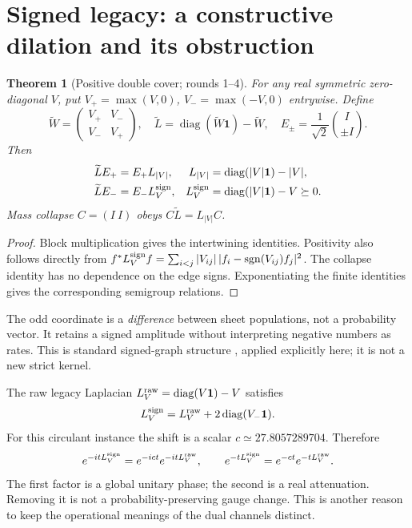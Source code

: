 \documentclass[11pt,a4paper]{article}
\newtheorem{theorem}{Theorem}
\newcommand{\one}{\mathbf 1}
\newcommand{\diag}{\operatorname{diag}}
\begin{document}
\section{Signed legacy: a constructive dilation and its obstruction}
\label{sec:signed}

\begin{theorem}[Positive double cover; rounds 1--4]
For any real symmetric zero-diagonal $V$, put
$V_+=\max(V,0)$, $V_-=\max(-V,0)$ entrywise. Define
\[
 \widetilde W=\begin{pmatrix}V_+&V_-\\V_-&V_+\end{pmatrix},\quad
 \widetilde L=\diag(\widetilde W\one)-\widetilde W,
 \quad E_\pm=\frac1{\sqrt2}\binom{I}{\pm I}.
\]
Then
\begin{align}
 \widetilde L E_+&=E_+L_{|V|},&
 L_{|V|}&=\diag(|V|\one)-|V|,\\
 \widetilde L E_-&=E_-L_V^{\rm sign},&
 L_V^{\rm sign}&=\diag(|V|\one)-V\succeq0.
\end{align}
Mass collapse $C=(I\ I)$ obeys $C\widetilde L=L_{|V|}C$.
\end{theorem}
\begin{proof}
Block multiplication gives the intertwining identities. Positivity also
follows directly from
$f^*L_V^{\rm sign}f=\sum_{i<j}|V_{ij}|\,
|f_i-\operatorname{sgn}(V_{ij})f_j|^2$.
The collapse identity has no dependence on the edge signs. Exponentiating
the finite identities gives the corresponding semigroup relations.
\end{proof}

The odd coordinate is a \emph{difference} between sheet populations, not a
probability vector. It retains a signed amplitude without interpreting
negative numbers as rates. This is standard signed-graph structure
\cite{zaslavsky}, applied explicitly here; it is not a new strict kernel.

The raw legacy Laplacian $L_V^{\rm raw}=\diag(V\one)-V$ satisfies
\[
 L_V^{\rm sign}=L_V^{\rm raw}+2\diag(V_-\one).
\]
For this circulant instance the shift is a scalar
$c\simeq27.8057289704$. Therefore
\[
 e^{-itL_V^{\rm sign}}=e^{-ict}e^{-itL_V^{\rm raw}},\qquad
 e^{-tL_V^{\rm sign}}=e^{-ct}e^{-tL_V^{\rm raw}}.
\]
The first factor is a global unitary phase; the second is a real attenuation.
Removing it is not a probability-preserving gauge change. This is another
reason to keep the operational meanings of the dual channels distinct.
\end{document}
